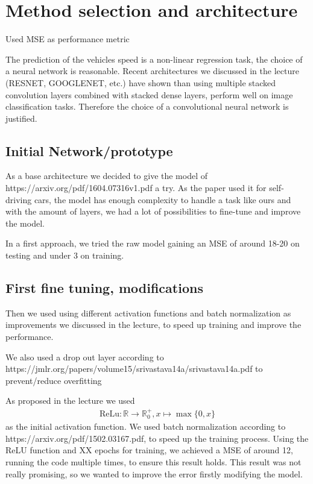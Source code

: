 \documentclass[conference]{IEEEtran}
\begin{document}
\section{Method selection and architecture}
Used MSE as performance metric

The prediction of the vehicles speed is a non-linear regression task, the choice of a neural network is reasonable. Recent 
architectures we discussed in the lecture (RESNET, GOOGLENET, etc.) have shown than using multiple stacked convolution layers
combined with stacked dense layers, perform well on image classification tasks. Therefore the choice of a convolutional neural network
is justified.

\subsection{Initial Network/prototype}

As a base architecture we decided to give the model of https://arxiv.org/pdf/1604.07316v1.pdf a try. As the paper used it
for self-driving cars, the model has enough complexity to handle a task like ours and with the amount of layers, we had a lot of
possibilities to fine-tune and improve the model.

In a first approach, we tried the raw model gaining an MSE of around 18-20 on testing and under 3 on training.

\subsection{First fine tuning, modifications}

Then we used using different activation functions and batch 
normalization as improvements we discussed in the lecture, to speed up training and improve the performance.

We also used a drop out layer according to https://jmlr.org/papers/volume15/srivastava14a/srivastava14a.pdf to prevent/reduce 
overfitting

As proposed in the lecture
we used
\begin{align*}
\mathrm{ReLu}: \mathbb{R} \to \mathbb{R}_0^+, x \mapsto \max\{0,x\}
\end{align*}
as the initial activation function. We used batch normalization according to https://arxiv.org/pdf/1502.03167.pdf, to speed up the 
training process. Using the ReLU function and XX epochs for training, we achieved a MSE of around 12, running the code multiple times, to ensure this result holds. This result was not really promising, so we wanted to improve the error firstly modifying the model.
\end{document}

